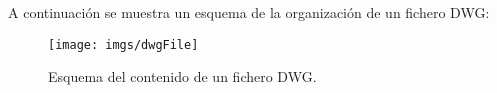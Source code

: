 A continuación se muestra un esquema de la organización de un fichero DWG:

\begin{figure}
\begin{center}
\texttt{[image: imgs/dwgFile]}
\caption{Esquema del contenido de un fichero DWG.}
\end{center}
\end{figure}









